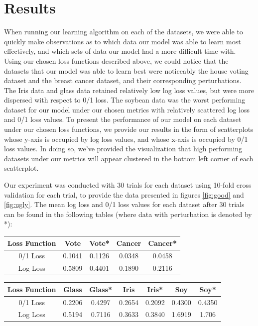 \documentclass[twoside,11pt]{article}
\begin{document}
\section{Results}

When running our learning algorithm on each of the datasets, we were able to quickly make observations as to which data our model was able to learn most effectively, and which sets of data
our model had a more difficult time with. Using our chosen loss functions described above, we could notice that the datasets that our model was able to learn best were noticeably the house
voting dataset and the breast cancer dataset, and their corresponding perturbations. The Iris data and glass data retained relatively low log loss values, but were more dispersed with respect 
to 0/1 loss. The soybean data was the worst performing dataset for our model under our chosen metrics with relatively scattered log loss and 0/1 loss values. To present the performance of our
model on each dataset under our chosen loss functions, we provide our results in the form of scatterplots whose y-axis is occupied by log loss values, and whose x-axis is occupied by 0/1 loss values.
In doing so, we've provided the visualization that high performing datasets under our metrics will appear clustered in the bottom left corner of each scatterplot.

Our experiment was conducted with 30 trials for each dataset using 10-fold cross validation for each trial, to provide the data presented in figures \ref{fig:good} and \ref{fig:ugly}. 
The mean log loss and 0/1 loss values for each dataset after 30 trials can be found in the following tables (where data with perturbation is denoted by *):

\begin{center}
 \begin{tabular}{|c c c c c|} 
 \hline
 Loss Function & Vote & Vote* & Cancer & Cancer*\\ [0.5ex] 
 \hline\hline
 0/1 Loss & 0.1041 & 0.1126 & 0.0348 & 0.0458\\ 
 \hline
 Log Loss & 0.5809 & 0.4401 & 0.1890 & 0.2116\\  
 \hline
\end{tabular}
\end{center}

\begin{center}
 \begin{tabular}{|c c c c c c c|} 
 \hline
 Loss Function & Glass & Glass* & Iris & Iris* & Soy & Soy*\\ [0.5ex] 
 \hline\hline
 0/1 Loss  & 0.2206 & 0.4297 & 0.2654 & 0.2092 & 0.4300 & 0.4350\\ 
 \hline
 Log Loss & 0.5194 & 0.7116 & 0.3633 & 0.3840 & 1.6919 & 1.706\\  
 \hline
\end{tabular}
\end{center}
\end{document}
